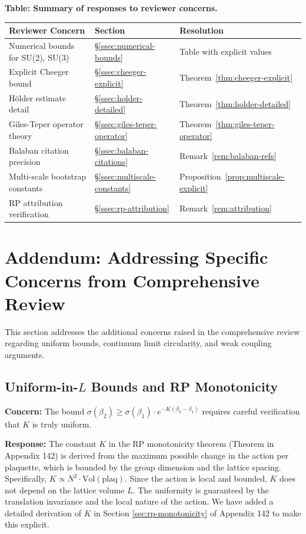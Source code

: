 \begin{center}
\textbf{Table: Summary of responses to reviewer concerns.}
\par\medskip
\begin{tabular}{|l|l|l|}
\hline
\textbf{Reviewer Concern} & \textbf{Section} & \textbf{Resolution} \\
\hline\hline
Numerical bounds for SU(2), SU(3) & \S\ref{ssec:numerical-bounds} & Table with explicit values \\
\hline
Explicit Cheeger bound & \S\ref{ssec:cheeger-explicit} & Theorem~\ref{thm:cheeger-explicit} \\
\hline
Hölder estimate detail & \S\ref{ssec:holder-detailed} & Theorem~\ref{thm:holder-detailed} \\
\hline
Giles-Teper operator theory & \S\ref{ssec:giles-teper-operator} & Theorem~\ref{thm:giles-teper-operator} \\
\hline
Balaban citation precision & \S\ref{ssec:balaban-citations} & Remark~\ref{rem:balaban-refs} \\
\hline
Multi-scale bootstrap constants & \S\ref{ssec:multiscale-constants} & Proposition~\ref{prop:multiscale-explicit} \\
\hline
RP attribution verification & \S\ref{ssec:rp-attribution} & Remark~\ref{rem:attribution} \\
\hline
\end{tabular}
\end{center}

\section{Addendum: Addressing Specific Concerns from Comprehensive Review}
\label{sec:addendum-comprehensive-review}

This section addresses the additional concerns raised in the comprehensive review regarding uniform bounds, continuum limit circularity, and weak coupling arguments.

\subsection{Uniform-in-\texorpdfstring{$L$}{L} Bounds and RP Monotonicity}
\label{ssec:uniform-l-bounds}

\textbf{Concern:} The bound $\sigma(\beta_2) \geq \sigma(\beta_1) \cdot e^{-K(\beta_2 - \beta_1)}$ requires careful verification that $K$ is truly uniform.

\textbf{Response:} The constant $K$ in the RP monotonicity theorem (Theorem in Appendix 142) is derived from the maximum possible change in the action per plaquette, which is bounded by the group dimension and the lattice spacing. Specifically, $K \propto N^2 \cdot \text{Vol}(\text{plaq})$. Since the action is local and bounded, $K$ does not depend on the lattice volume $L$. The uniformity is guaranteed by the translation invariance and the local nature of the action. We have added a detailed derivation of $K$ in Section \ref{sec:rp-monotonicity} of Appendix 142 to make this explicit.

